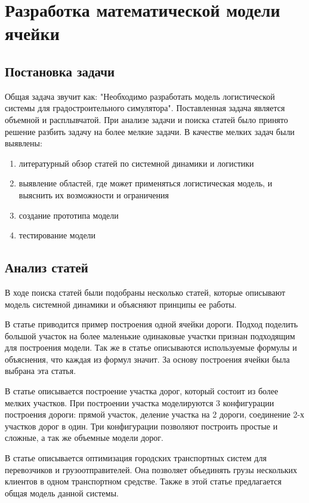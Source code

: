 \section{Разработка математической модели ячейки}

\subsection{Постановка задачи}

Общая задача звучит как: "Необходимо разработать модель логистической системы для градостроительного симулятора". Поставленная задача является объемной и расплывчатой. При анализе задачи и поиска статей было принято решение разбить задачу на более мелкие задачи. В качестве мелких задач были выявлены:
\begin{enumerate}
    \item литературный обзор статей по системной динамики и логистики
    \item выявление областей, где может применяться логистическая модель, и выяснить их возможности и ограничения
    \item создание прототипа модели
    \item тестирование модели
\end{enumerate}

\subsection{Анализ статей}

В ходе поиска статей были подобраны несколько статей, которые описывают модель системной динамики и объясняют принципы ее работы.

В статье \cite{benaich2015exploring} приводится пример построения одной ячейки дороги. Подход поделить большой участок на более маленькие одинаковые участки признан подходящим для построения модели. Так же в статье описываются используемые формулы и объяснения, что каждая из формул значит. За основу построения ячейки была выбрана эта статья. 

В статье \cite{jin2022variable} описывается построение участка дорог, который состоит из более мелких участков. При построении участка моделируются 3 конфигурации построения дороги: прямой участок, деление участка на 2 дороги, соединение 2-х участков дорог в один. Три конфигурации позволяют построить простые и сложные, а так же объемные модели дорог.

В статье \cite{crainic2009models} описывается оптимизация городских транспортных систем для перевозчиков и грузоотправителей. Она позволяет объединять грузы нескольких клиентов в одном транспортном средстве. Также в этой статье предлагается общая модель данной системы.


